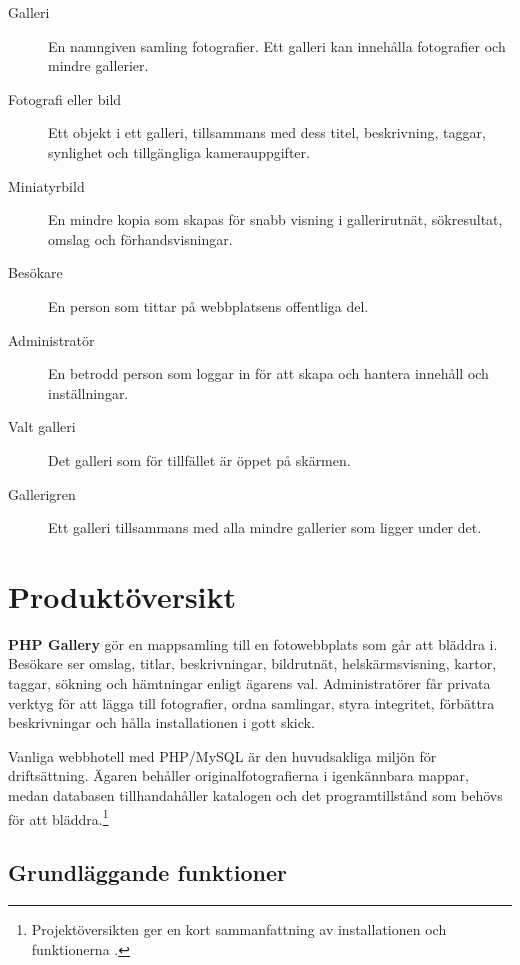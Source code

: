 \documentclass[11pt,a4paper]{article}
\newcommand{\product}{\textbf{PHP Gallery}}
\begin{document}
\begin{description}
  \item[Galleri] En namngiven samling fotografier. Ett galleri kan innehålla
  fotografier och mindre gallerier.
  \item[Fotografi eller bild] Ett objekt i ett galleri, tillsammans med dess
  titel, beskrivning, taggar, synlighet och tillgängliga kamerauppgifter.
  \item[Miniatyrbild] En mindre kopia som skapas för snabb visning i
  gallerirutnät, sökresultat, omslag och förhandsvisningar.
  \item[Besökare] En person som tittar på webbplatsens offentliga del.
  \item[Administratör] En betrodd person som loggar in för att skapa och hantera
  innehåll och inställningar.
  \item[Valt galleri] Det galleri som för tillfället är öppet på skärmen.
  \item[Gallerigren] Ett galleri tillsammans med alla mindre gallerier som
  ligger under det.
\end{description}

\section{Produktöversikt}
\label{sec:overview}

\product{} gör en mappsamling till en fotowebbplats som går att bläddra i.
Besökare ser omslag, titlar, beskrivningar, bildrutnät, helskärmsvisning,
kartor, taggar, sökning och hämtningar enligt ägarens val. Administratörer får
privata verktyg för att lägga till fotografier, ordna samlingar, styra
integritet, förbättra beskrivningar och hålla installationen i gott skick.

Vanliga webbhotell med PHP/MySQL är den huvudsakliga miljön för driftsättning.
Ägaren behåller originalfotografierna i igenkännbara mappar, medan databasen
tillhandahåller katalogen och det programtillstånd som behövs för att
bläddra.\footnote{Projektöversikten ger en kort sammanfattning av installationen
och funktionerna \cite{readme}.}

\subsection{Grundläggande funktioner}
\end{document}
